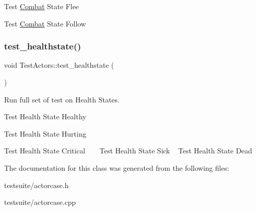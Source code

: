 Test \mbox{\hyperlink{classCombat}{Combat}} State Flee

Test \mbox{\hyperlink{classCombat}{Combat}} State Follow \mbox{\label{classTestActors_a1dbd79e63638e20627e7ab62fb90fce6}} 
\subsubsection{\texorpdfstring{test\+\_\+healthstate()}{test\_healthstate()}}
{\footnotesize\ttfamily void Test\+Actors\+::test\+\_\+healthstate (\begin{DoxyParamCaption}{ }\end{DoxyParamCaption})}



Run full set of test on Health States. 

Test Health State Healthy

Test Health State Hurting

Test Health State Critical ~\newline
~\newline
 Test Health State Sick ~\newline
 Test Health State Dead 

The documentation for this class was generated from the following files\+:\begin{DoxyCompactItemize}
\item 
testsuite/actorcase.\+h\item 
testsuite/actorcase.\+cpp\end{DoxyCompactItemize}
